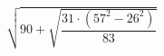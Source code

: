 \begin{ex}[type=calculate]
	\begin{condition}
		\( \sqrt{90+\sqrt{\dfrac{31\cdot(57^2-26^2)}{83}}} \)
	\end{condition}
\end{ex}
